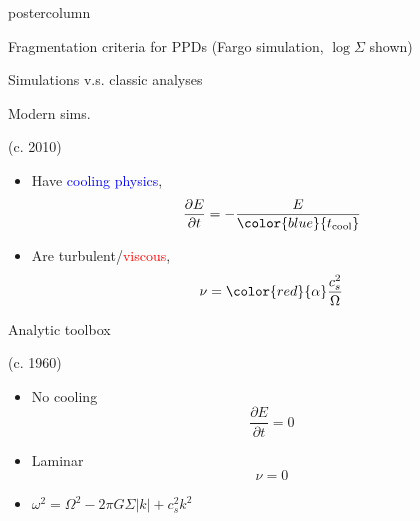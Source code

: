 \documentclass[final,hyperref={pdfpagelabels=false}]{beamer}
\newcommand{\p}{\partial}
\begin{document}
\begin{frame}
\begin{columns}
\begin{column}{.49\textwidth}
\begin{beamercolorbox}[center,wd=\textwidth]{postercolumn}
\begin{minipage}[T]{.95\textwidth}
{\begin{block}{{\Large Fragmentation criteria for PPDs}}
            (Fargo simulation, $\log \Sigma$ shown)
            \end{block}
            
            \begin{block}{{\Large Simulations v.s. classic analyses}}
              \justifying
              \begin{minipage}[t]{0.49\linewidth}
                \centering \begin{onlinebox}{5cm}Modern sims.\end{onlinebox}
                  (c. 2010)
                  \begin{itemize}
                  \item Have \textcolor{blue}{cooling physics}, 
                    \[
                    \frac{\p E}{\p t} = - \frac{E}{\color{blue}{t_\mathrm{cool}}}
                    \]
                  \item Are turbulent/\textcolor{red}{viscous}, 
                    \[
                    \nu = {\color{red}{\alpha}}\frac{c_s^2}{\Omega}
                    \]
                  \end{itemize}
              \end{minipage}
              \begin{minipage}[t]{0.49\linewidth}
                \centering \begin{onlinebox}{6cm}Analytic toolbox\end{onlinebox}
                  (c. 1960) \\
                  \begin{itemize}
                  \item No cooling 
                    \[
                    \frac{\p E}{\p t} = 0
                    \]
                  \item Laminar 
                    \[
                    \nu = 0
                    \]
                  \item $\omega^2= \Omega^2 - 2\pi G \Sigma |k| +
                    c_s^2k^2 $
                  \end{itemize}
              \end{minipage}\\
              \vspace{1cm}
            
              

\end{block}}
\end{minipage}
\end{beamercolorbox}
\end{column}
\end{columns}
\end{frame}
\end{document}
